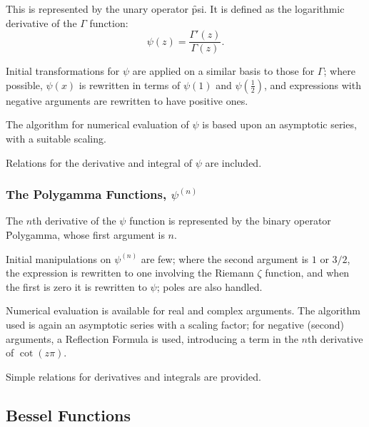This is represented by the unary operator \f{psi}. It is defined as the
logarithmic derivative of the $\Gamma$  function:
\[ \psi(z) = \frac{\Gamma'(z)}{\Gamma(z)}. \]

Initial transformations for $\psi$ are applied on a similar basis to
those for $\Gamma$; where possible, $\psi(x)$ is rewritten in
terms of $\psi(1)$ and $\psi(\frac{1}{2})$, and expressions with negative
arguments are rewritten to have positive ones.

The algorithm for numerical evaluation of $\psi$ is based upon an
asymptotic series, with a suitable scaling.

Relations for the derivative and integral of $\psi$ are included.

\subsubsection{The Polygamma Functions, $\psi^{(n)}$}
\hypertarget{POLYGAM}{}

The $n$th derivative of the $\psi$ function is represented by the
binary operator \f{Polygamma}, whose first argument is $n$.

Initial manipulations on $\psi^{(n)}$ are few; where the second argument
is $1$ or $3/2$, the expression is rewritten to one involving the
Riemann $\zeta$ function, and when the first is zero it is rewritten to
$\psi$; poles are also handled.

Numerical evaluation is available for real and complex arguments. The
algorithm used is again an asymptotic series with a scaling factor; for
negative (second) arguments, a Reflection Formula is used, introducing a
term in the $n$th derivative of $\cot(z\pi)$.

Simple relations for derivatives and integrals are provided.

\subsection{Bessel Functions}
\hypertarget{operator:BESSELI}{}
\hypertarget{operator:BESSELJ}{}
\hypertarget{operator:BESSELK}{}
\hypertarget{operator:BESSELY}{}
\hypertarget{operator:HANKEL1}{}
\hypertarget{operator:HANKEL2}{}
\hypertarget{BESSELF}{}

